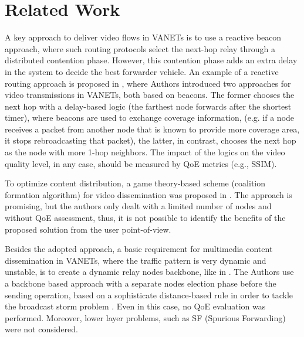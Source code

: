 \documentclass{sig-alternate-2013}
\begin{document}
\section{Related Work}
\label{related}

A key approach to deliver video flows in VANETs is to use a reactive beacon approach, where such routing protocols select the next-hop relay through a distributed contention phase. However, this contention phase adds an extra delay in the system to decide the best forwarder vehicle.
An example of a reactive routing approach is proposed in \cite{torres2014v2x}, where Authors introduced two approaches for video transmissions in VANETs, both based on beacons. The former chooses the next hop with a delay-based logic (the farthest node forwards after the shortest timer), where beacons are used to exchange coverage information, (e.g. if a node receives a packet from another node that is known to provide more coverage area, it stops rebroadcasting that packet), the latter, in contrast, chooses the next hop as the node with more 1-hop neighbors. The impact of the logics on the video quality level, in any case, should be measured by QoE metrics (e.g., SSIM).

To optimize content distribution, a game theory-based scheme  (coalition formation algorithm) for video dissemination was proposed in \cite{MultimediaGameTheory}. The approach is promising, but the authors only dealt with a limited number of nodes and without QoE assessment, thus, it is not possible to identify the benefits of the proposed solution from the user point-of-view.

Besides the adopted approach, a basic requirement for multimedia content dissemination in VANETs, where the traffic pattern is very dynamic and unstable, is to create a dynamic relay nodes backbone, like in \cite{rezende2014receiver}. The Authors use a backbone based approach with a separate nodes election phase before the sending operation, based on a sophisticate distance-based rule in order to tackle the broadcast storm problem \cite{StormNew}. Even in this case, no QoE evaluation was performed. Moreover, lower layer problems, such as SF (Spurious Forwarding) were not considered.
\end{document}
